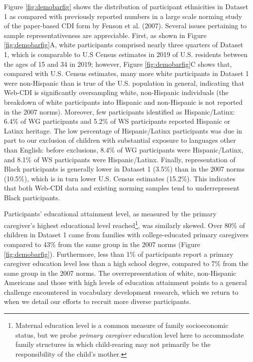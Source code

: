 \documentclass[
  english,
  ,man,floatsintext]{apa6}
\begin{document}
Figure \ref{fig:demobarfig} shows the distribution of participant ethnicities in Dataset 1 as compared with previously reported numbers in a large scale norming study of the paper-based CDI form by Fenson et al. (2007). Several issues pertaining to sample representativeness are appreciable. First, as shown in Figure \ref{fig:demobarfig}A, white participants comprised nearly three quarters of Dataset 1, which is comparable to U.S Census estimates in 2019 of U.S. residents between the ages of 15 and 34 in 2019; however, Figure \ref{fig:demobarfig}C shows that, compared with U.S. Census estimates, many more white participants in Dataset 1 were non-Hispanic than is true of the U.S. population in general, indicating that Web-CDI is significantly oversampling white, non-Hispanic individuals (the breakdown of white participants into Hispanic and non-Hispanic is not reported in the 2007 norms). Moreover, few participants identified as Hispanic/Latinx: 6.4\% of WG participants and 5.2\% of WS participants reported Hispanic or Latinx heritage. The low percentage of Hispanic/Latinx participants was due in part to our exclusion of children with substantial exposure to languages other than English: before exclusions, 8.4\% of WG participants were Hispanic/Latinx, and 8.1\% of WS participants were Hispanic/Latinx. Finally, representation of Black participants is generally lower in Dataset 1 (3.5\%) than in the 2007 norms (10.5\%), which is in turn lower U.S. Census estimates (15.2\%). This indicates that both Web-CDI data and existing norming samples tend to underrepresent Black participants.

Participants' educational attainment level, as measured by the primary caregiver's highest educational level reached\footnote{Maternal education level is a common measure of family socioeconomic status, but we probe \emph{primary caregiver} education level here to accommodate family structures in which child-rearing may not primarily be the responsibility of the child's mother.}, was similarly skewed. Over 80\% of children in Dataset 1 came from families with college-educated primary caregivers compared to 43\% from the same group in the 2007 norms (Figure \ref{fig:demobarfig}). Furthermore, less than 1\% of participants report a primary caregiver education level less than a high school degree, compared to 7\% from the same group in the 2007 norms. The overrepresentation of white, non-Hispanic Americans and those with high levels of education attainment points to a general challenge encountered in vocabulary development research, which we return to when we detail our efforts to recruit more diverse participants.
\end{document}
